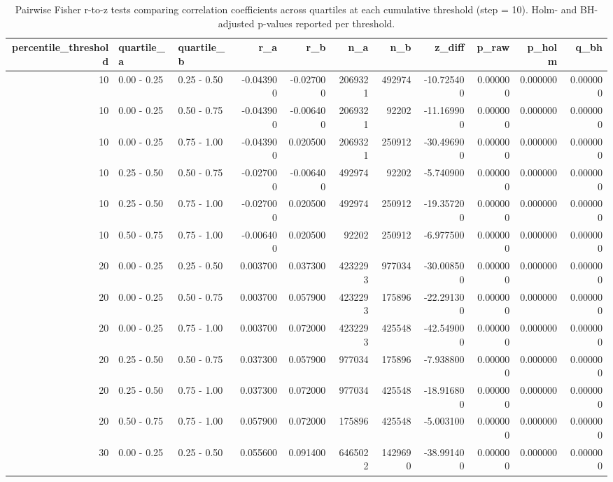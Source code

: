 \begin{table}
\caption{Pairwise Fisher r-to-z tests comparing correlation coefficients across quartiles at each cumulative threshold (step = 10). Holm- and BH-adjusted p-values reported per threshold.}
\label{tab:quartile_line_tests}
\begin{tabular}{rllrrrrrrrr}
\toprule
percentile\_threshold & quartile\_a & quartile\_b & r\_a & r\_b & n\_a & n\_b & z\_diff & p\_raw & p\_holm & q\_bh \\
\midrule
10 & 0.00 - 0.25 & 0.25 - 0.50 & -0.043900 & -0.027000 & 2069321 & 492974 & -10.725400 & 0.000000 & 0.000000 & 0.000000 \\
10 & 0.00 - 0.25 & 0.50 - 0.75 & -0.043900 & -0.006400 & 2069321 & 92202 & -11.169900 & 0.000000 & 0.000000 & 0.000000 \\
10 & 0.00 - 0.25 & 0.75 - 1.00 & -0.043900 & 0.020500 & 2069321 & 250912 & -30.496900 & 0.000000 & 0.000000 & 0.000000 \\
10 & 0.25 - 0.50 & 0.50 - 0.75 & -0.027000 & -0.006400 & 492974 & 92202 & -5.740900 & 0.000000 & 0.000000 & 0.000000 \\
10 & 0.25 - 0.50 & 0.75 - 1.00 & -0.027000 & 0.020500 & 492974 & 250912 & -19.357200 & 0.000000 & 0.000000 & 0.000000 \\
10 & 0.50 - 0.75 & 0.75 - 1.00 & -0.006400 & 0.020500 & 92202 & 250912 & -6.977500 & 0.000000 & 0.000000 & 0.000000 \\
20 & 0.00 - 0.25 & 0.25 - 0.50 & 0.003700 & 0.037300 & 4232293 & 977034 & -30.008500 & 0.000000 & 0.000000 & 0.000000 \\
20 & 0.00 - 0.25 & 0.50 - 0.75 & 0.003700 & 0.057900 & 4232293 & 175896 & -22.291300 & 0.000000 & 0.000000 & 0.000000 \\
20 & 0.00 - 0.25 & 0.75 - 1.00 & 0.003700 & 0.072000 & 4232293 & 425548 & -42.549000 & 0.000000 & 0.000000 & 0.000000 \\
20 & 0.25 - 0.50 & 0.50 - 0.75 & 0.037300 & 0.057900 & 977034 & 175896 & -7.938800 & 0.000000 & 0.000000 & 0.000000 \\
20 & 0.25 - 0.50 & 0.75 - 1.00 & 0.037300 & 0.072000 & 977034 & 425548 & -18.916800 & 0.000000 & 0.000000 & 0.000000 \\
20 & 0.50 - 0.75 & 0.75 - 1.00 & 0.057900 & 0.072000 & 175896 & 425548 & -5.003100 & 0.000000 & 0.000000 & 0.000000 \\
30 & 0.00 - 0.25 & 0.25 - 0.50 & 0.055600 & 0.091400 & 6465022 & 1429690 & -38.991400 & 0.000000 & 0.000000 & 0.000000 \\

\end{tabular}
\end{table}
